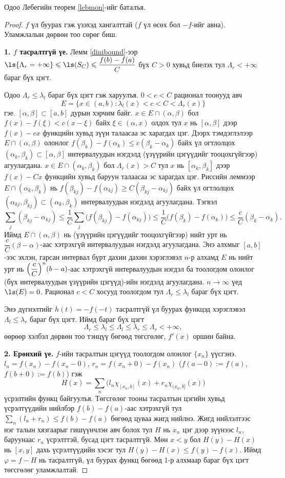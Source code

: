 Одоо Лебегийн теорем \ref{lebmon}-ийг баталъя.
\begin{proof}
$f$ үл буурах гэж үзэхэд хангалттай ($f$ үл өсөх бол $-f$-ийг авна). Уламжлалын дөрвөн тоо сөрөг биш.

\textbf{1. $f$ тасралтгүй үе.} Лемм \ref{dinibound}-ээр $\ls\{\Lambda_r=+\infty\}\leqslant\ls(S_C)\leqslant\dfrac{f(b)-f(a)}{C}$ бүх $C>0$ хувьд биелэх тул $\Lambda_r<+\infty$ бараг бүх цэгт.

Одоо $\Lambda_r\leqslant\lambda_l$ бараг бүх цэгт гэж харуулъя. $0<c<C$ рационал тоонууд авч
$$E=\{x\in(a,b): \lambda_l(x)<c<C<\Lambda_r(x)\}$$
гэе. $[\alpha,\beta]\subset[a,b]$ дурын хэрчим байг. $x\in E\cap(\alpha,\beta)$ бол $f(x)-f(\xi)<c(x-\xi)$ байх $\xi\in(\alpha,x)$ олдох тул $x$ нь $[\alpha,\beta]$ дээр $f(x)-cx$ функцийн хувьд зүүн талаасаа эс харагдах цэг. Дээрх тэмдэглэлээр $E\cap(\alpha,\beta)$ олонлог $f(\beta_k)-f(\alpha_k)\leqslant c(\beta_k-\alpha_k)$ байх үл огтлолцох $(\alpha_k,\beta_k)\subset[\alpha,\beta]$ интервалуудын нэгдэлд (үзүүрийн цэгүүдийг тооцохгүйгээр) агуулагдана. $x\in E\cap(\alpha_k,\beta_k)$ бол $\Lambda_r(x)>C$ тул $x$ нь $[\alpha_k,\beta_k]$ дээр $f(x)-Cx$ функцийн хувьд баруун талаасаа эс харагдах цэг. Риссийн леммээр $E\cap(\alpha_k,\beta_k)$ нь $f(\beta_{kj})-f(\alpha_{kj})\geqslant C(\beta_{kj}-\alpha_{kj})$ байх үл огтлолцох $(\alpha_{kj},\beta_{kj})\subset(\alpha_k,\beta_k)$ интервалуудын нэгдэлд агуулагдана. Тэгвэл
$$\sum_j(\beta_{kj}-\alpha_{kj})\leqslant\frac1C\sum_j\bigl(f(\beta_{kj})-f(\alpha_{kj})\bigr)\leqslant\frac1C\bigl(f(\beta_k)-f(\alpha_k)\bigr)\leqslant\frac cC(\beta_k-\alpha_k).$$
Иймд $E\cap(\alpha,\beta)$ нь (үзүүрийн цэгүүдийг тооцохгүйгээр) нийт урт нь $\dfrac cC(\beta-\alpha)$-аас хэтрэхгүй интервалуудын нэгдэлд агуулагдана. Энэ алхмыг $[a,b]$-ээс эхлэн, гарсан интервал бүрт дахин дахин хэрэглэвэл $n$-р алхамд $E$ нь нийт урт нь $\Bigl(\dfrac cC\Bigr)^n(b-a)$-аас хэтрэхгүй интервалуудын нэгдэл ба тоологдом олонлог (бүх интервалуудын үзүүрийн цэгүүд)-ийн нэгдэлд агуулагдана. $n\to\infty$ үед $\ls(E)=0$. Рационал $c<C$ хосууд тоологдом тул $\Lambda_r\leqslant\lambda_l$ бараг бүх цэгт.

Энэ дүгнэлтийг $h(t)=-f(-t)$ тасралтгүй үл буурах функцэд хэрэглэвэл $\Lambda_l\leqslant\lambda_r$ бараг бүх цэгт. Иймд бараг бүх цэгт
$$\Lambda_r\leqslant\lambda_l\leqslant\Lambda_l\leqslant\lambda_r\leqslant\Lambda_r<+\infty,$$
өөрөөр хэлбэл дөрвөн тоо тэнцүү бөгөөд төгсгөлөг, $f'(x)$ оршин байна.

\textbf{2. Ерөнхий үе.} $f$-ийн тасралтын цэгүүд тоологдом олонлог $\{x_n\}$ үүсгэнэ. $l_n=f(x_n)-f(x_n-0)$, $r_n=f(x_n+0)-f(x_n)$ ($f(a-0):=f(a)$, $f(b+0):=f(b)$) гэж
$$H(x)=\sum_n\bigl(l_n\chi_{[x_n,b]}(x)+r_n\chi_{(x_n,b]}(x)\bigr)$$
үсрэлтийн функц байгуулъя. Төгсгөлөг тооны тасралтын цэгийн хувьд үсрэлтүүдийн нийлбэр $f(b)-f(a)$-аас хэтрэхгүй тул $\sum_n(l_n+r_n)\leqslant f(b)-f(a)$ бөгөөд цуваа жигд нийлнэ. Жигд нийлэлтээс нэг талын хязгаарыг гишүүнчлэн авч болох тул $H$ нь $x_n$ цэг дээр зүүнээс $l_n$, баруунаас $r_n$ үсрэлттэй, бусад цэгт тасралтгүй. Мөн $x<y$ бол $H(y)-H(x)$ нь $[x,y]$ дахь үсрэлтүүдийн хэсэг тул $H(y)-H(x)\leqslant f(y)-f(x)$. Иймд $\varphi=f-H$ нь тасралтгүй, үл буурах функц бөгөөд 1-р алхмаар бараг бүх цэгт төгсгөлөг уламжлалтай.


\end{proof}
